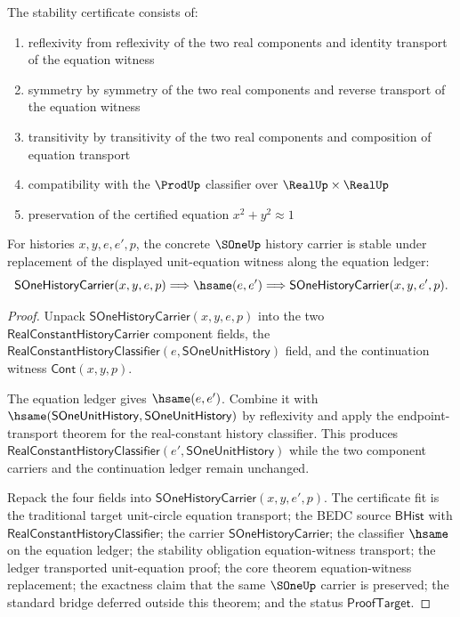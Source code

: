 \begin{definition}
\label{def:s1-stability-certificate}
The stability certificate consists of:
\begin{enumerate}
  \item reflexivity from reflexivity of the two real components and identity transport of the equation witness
  \item symmetry by symmetry of the two real components and reverse transport of the equation witness
  \item transitivity by transitivity of the two real components and composition of equation transport
  \item compatibility with the $\ProdUp$ classifier over $\RealUp \times \RealUp$
  \item preservation of the certified equation $x^2 + y^2 \approx 1$
\end{enumerate}
\end{definition}

\begin{theorem}
\label{thm:s1-equation-witness-transport}
For histories $x,y,e,e',p$, the concrete $\SOneUp$ history carrier is stable
under replacement of the displayed unit-equation witness along the equation
ledger:
$$
\mathsf{SOneHistoryCarrier}(x,y,e,p)
\Longrightarrow
\hsame(e,e')
\Longrightarrow
\mathsf{SOneHistoryCarrier}(x,y,e',p).
$$
\end{theorem}
\begin{proof}
Unpack $\mathsf{SOneHistoryCarrier}(x,y,e,p)$ into the two
$\mathsf{RealConstantHistoryCarrier}$ component fields, the
$\mathsf{RealConstantHistoryClassifier}(e,\mathsf{SOneUnitHistory})$ field,
and the continuation witness $\mathsf{Cont}(x,y,p)$.

The equation ledger gives $\hsame(e,e')$. Combine it with
$\hsame(\mathsf{SOneUnitHistory},\mathsf{SOneUnitHistory})$ by reflexivity and
apply the endpoint-transport theorem for the real-constant history classifier.
This produces
$\mathsf{RealConstantHistoryClassifier}(e',\mathsf{SOneUnitHistory})$ while the
two component carriers and the continuation ledger remain unchanged.

Repack the four fields into $\mathsf{SOneHistoryCarrier}(x,y,e',p)$. The
certificate fit is the traditional target unit-circle equation transport; the
BEDC source $\mathsf{BHist}$ with $\mathsf{RealConstantHistoryClassifier}$; the
carrier $\mathsf{SOneHistoryCarrier}$; the classifier $\hsame$ on the equation
ledger; the stability obligation equation-witness transport; the ledger
transported unit-equation proof; the core theorem equation-witness replacement;
the exactness claim that the same $\SOneUp$ carrier is preserved; the standard
bridge deferred outside this theorem; and the status $\mathsf{ProofTarget}$.
\end{proof}

